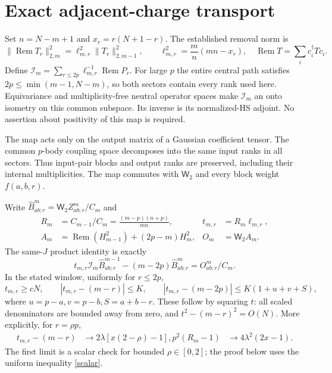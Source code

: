 \documentclass[11pt,a4paper]{article}
\newcommand{\Rem}{\operatorname{Rem}}
\newcommand{\W}{\mathsf W_2}
\newcommand{\Id}{\mathcal I}
\begin{document}
\newpage
\section{Exact adjacent-charge transport}
Set $n=N-m+1$ and $x_r=r(N+1-r)$. The established removal norm is
\begin{equation}
 \|\Rem T_r\|_{2,m}^2=\ell_{m,r}^2\|T_r\|_{2,m-1}^2,
 \qquad \ell_{m,r}^2=\frac m n(mn-x_r),\quad
 \Rem T=\sum_i c_i^\dagger T c_i.\label{rem}
\end{equation}
Define $\Id_m=\sum_{r\le2p}\ell_{m,r}^{-1}\Rem P_r$.
For large $p$ the entire central path satisfies
$2p\le\min(m-1,N-m)$, so both sectors contain every rank used here.
Equivariance and multiplicity-free neutral operator spaces make
$\Id_m$ an onto isometry on this common subspace. Its inverse is
its normalized-HS adjoint. No assertion about positivity of this
map is required.

The map acts only on the output matrix of a Gaussian coefficient
tensor. The common $p$-body coupling space decomposes into the same
input ranks in all sectors. Thus input-pair blocks and output ranks
are preserved, including their internal multiplicities. The map
commutes with $\W$ and every block weight $f(a,b,r)$.

Write $\widehat B^m_{ab;r}=\W Z^m_{ab;r}/C_m$ and
\begin{align}
 R_m&=C_{m-1}/C_m=\frac{(m-p)(n+p)}{mn},&t_{m,r}&=R_m\ell_{m,r},\\
 A_m&=\Rem(H_{m-1}^2)+(2p-m)H_m^2,&O_m&=\W A_m.
\end{align}
The same-$J$ product identity is exactly
\begin{equation}
 t_{m,r}\Id_m\widehat B^{m-1}_{ab;r}-(m-2p)\widehat B^m_{ab;r}
       =O^m_{ab;r}/C_m.\label{identity}
\end{equation}
In the stated window, uniformly for $r\le2p$,
\begin{equation}
 t_{m,r}\ge cN,\qquad |t_{m,r}-(m-r)|\le K,\qquad
 |t_{m,r}-(m-2p)|\le K(1+u+v+S),\label{scalar}
\end{equation}
where $u=p-a,v=p-b,S=a+b-r$. These follow by squaring $t$:
all scaled denominators are bounded away from zero, and
$t^2-(m-r)^2=O(N)$. More explicitly, for $r=\rho p$,
\begin{align}
 t_{m,r}-(m-r)&\longrightarrow2\lambda[x(2-\rho)-1],
 p^2(R_m-1)&\longrightarrow4\lambda^2(2x-1).
\end{align}
The first limit is a scalar check for bounded $\rho\in[0,2]$;
the proof below uses the uniform inequality \eqref{scalar}.
\end{document}
